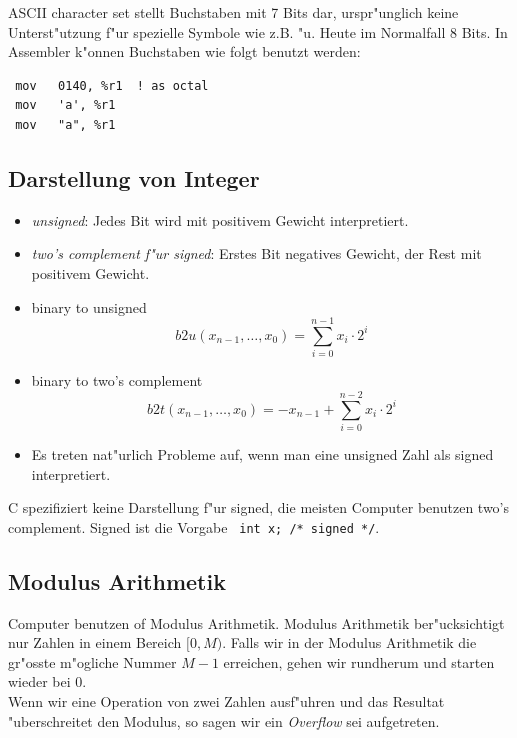 \documentclass[german, 10pt, a4paper, twocolumn]{scrartcl}
\begin{document}
ASCII character set stellt Buchstaben mit 7 Bits dar, urspr"unglich keine Unterst"utzung f"ur spezielle Symbole wie z.B. "u. Heute im Normalfall 8 Bits. In Assembler k"onnen Buchstaben wie folgt benutzt werden:
\begin{verbatim}
 mov   0140, %r1  ! as octal
 mov   'a', %r1
 mov   "a", %r1
\end{verbatim}

\subsection{Darstellung von Integer}

\begin{itemize}
	\item \textit{unsigned}: Jedes Bit wird mit positivem Gewicht interpretiert.
	\item \textit{two's complement f"ur signed}: Erstes Bit negatives Gewicht, der Rest mit positivem Gewicht.
	\item binary to unsigned
		\begin{displaymath}
			b2u(x_{n-1},\ldots,x_0) = \sum^{n-1}_{i = 0} x_i\cdotp 2^i
		\end{displaymath}
	\item binary to two's complement
		\begin{displaymath}
			b2t(x_{n-1},\ldots,x_0) = -x_{n-1} + \sum^{n-2}_{i = 0} x_i\cdotp 2^i
		\end{displaymath}
	\item Es treten nat"urlich Probleme auf, wenn man eine unsigned Zahl als signed interpretiert.
\end{itemize}

C spezifiziert keine Darstellung f"ur signed, die meisten Computer benutzen two's complement. Signed ist die Vorgabe \verb# int x; /* signed */#.

\subsection{Modulus Arithmetik}

Computer benutzen of Modulus Arithmetik. Modulus Arithmetik ber"ucksichtigt nur Zahlen in einem Bereich $[0,M)$. Falls wir in der Modulus Arithmetik die gr"osste m"ogliche Nummer $M-1$ erreichen, gehen wir rundherum und starten wieder bei $0$.\\

Wenn wir eine Operation von zwei Zahlen ausf"uhren und das Resultat "uberschreitet den Modulus, so sagen wir ein \textit{Overflow} sei aufgetreten.
\end{document}
